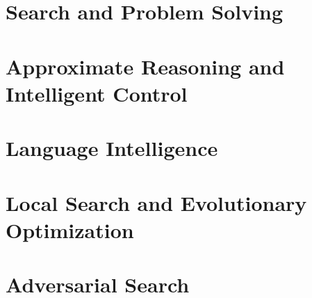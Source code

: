 \documentclass[11pt,oneside,a4paper]{report}
\begin{document}
\utpfrontmatter



\part{Search and Problem Solving}








\part{Approximate Reasoning and Intelligent Control}





\part{Language Intelligence}





\part{Local Search and Evolutionary Optimization}




\part{Adversarial Search}

\end{document}
